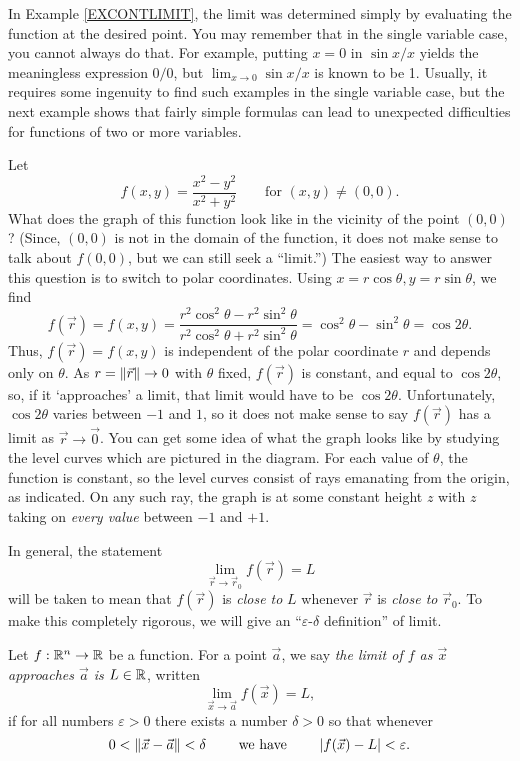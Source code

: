 In Example \ref{EXCONTLIMIT}, the limit was determined simply by evaluating the
function at the desired point.  You may remember that in the single
variable case, you cannot always do that.
For example, putting $x = 0$ in  $\sin x/x$ yields the meaningless
expression $0/0$, but $\lim_{x \to 0} \sin x/x$ is known to be 1.
Usually, it requires some ingenuity to find such examples in the single
variable case, but the next example shows that fairly simple formulas
can lead to unexpected difficulties for functions of two or more
variables.

\begin{example}
	\label{EXDISCONT}
	Let
	\[
	   f(x,y) = \frac{x^2 - y^2}{x^2 + y^2}\qquad\text{for } (x,y) \not= (0,0).
	\]
	 What does the graph of this function look like in the vicinity
	of the point $(0,0)$?   (Since, $(0,0)$ is not in the domain of
	the function, it does not make sense  to talk about
	$f(0,0)$, but we can still seek a ``limit.'')  The easiest way to
	answer this question is to switch to polar coordinates.   Using
	$x = r\cos\theta, y = r\sin\theta$, we find
	\[
	f(\vec r) = f(x,y) = \frac{r^2\cos^2\theta - r^2\sin^2\theta}
	{r^2\cos^2\theta + r^2\sin^2\theta} = \cos^2\theta - \sin^2\theta
	 = \cos 2\theta.
	\]
	Thus, $f(\vec r) = f(x,y)$
	is independent of the polar coordinate $r$ and depends only
	on $\theta$.  As $r = \lVert\vec r\rVert \to 0$ with $\theta$ fixed, $f(\vec r)$
	is constant, and equal to $\cos 2\theta$, so, if  it `approaches'
	a limit, that limit would have to be $\cos 2\theta$.  
	Unfortunately, $\cos 2\theta$ varies between $-1$ and $1$, so it
	does not make sense to say $f(\vec r)$ has a limit as $\vec r \to \vec 0$.
	You can get some idea of what the graph looks like by studying the
	level curves which are pictured in the diagram.  For each value
	of $\theta$, the function is constant, so the level curves consist
	of rays emanating from the origin, as indicated.  On any such
	ray, the graph is at some constant height $z$ with $z$ taking on
	\emph{every value} between $-1$ and $+1$.
\end{example}

In general, the statement
\[
  \lim_{\vec r \to \vec r_0} f(\vec r) = L
\]
will be taken to mean that $f(\vec r)$ is \emph{close to} $L$ whenever
$\vec r$ is \emph{close to } $\vec r_0$.   To make this completely
rigorous, we will give an ``$\varepsilon$-$\delta$ definition'' of limit.
 
\begin{definition}[Limit]
	Let $f:\mathbb{R}^n\to \mathbb{R}$ be a function.  For a point $\vec a$,
	we say \emph{the limit of $f$ as $\vec x$ approaches
	$\vec a$ is $L\in\mathbb{R}$}, written
	\[
		\lim_{\vec x\to \vec a}f(\vec x)=L,
	\]
	if for all numbers $\varepsilon>0$ there exists a number
	$\delta >0$ so that whenever
	\[
		0<\lVert\vec x-\vec a\rVert<\delta\qquad\text{ we have }\qquad\lvert f(\vec x)-L\rvert<\varepsilon.
	\]
\end{definition}

